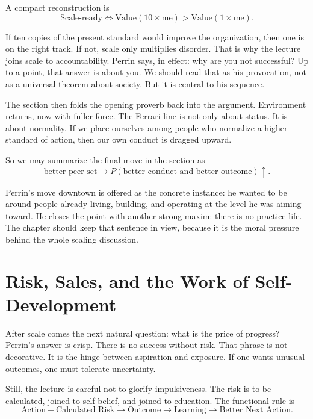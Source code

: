 A compact reconstruction is
\begin{equation}
\text{Scale-ready}
\iff
\text{Value}(10\times \text{me}) > \text{Value}(1\times \text{me}).
\end{equation}

If ten copies of the present standard would improve the organization, then one is on the right track. If not, scale only multiplies disorder. That is why the lecture joins scale to accountability. Perrin says, in effect: why are you not successful? Up to a point, that answer is about you. We should read that as his provocation, not as a universal theorem about society. But it is central to his sequence.

The section then folds the opening proverb back into the argument. Environment returns, now with fuller force. The Ferrari line is not only about status. It is about normality. If we place ourselves among people who normalize a higher standard of action, then our own conduct is dragged upward.

So we may summarize the final move in the section as
\begin{equation}
\text{better peer set} \to P(\text{better conduct and better outcome}) \uparrow .
\end{equation}

Perrin's move downtown is offered as the concrete instance: he wanted to be around people already living, building, and operating at the level he was aiming toward. He closes the point with another strong maxim: there is no practice life. The chapter should keep that sentence in view, because it is the moral pressure behind the whole scaling discussion.

\section{Risk, Sales, and the Work of Self-Development}

After scale comes the next natural question: what is the price of progress? Perrin's answer is crisp. There is no success without risk. That phrase is not decorative. It is the hinge between aspiration and exposure. If one wants unusual outcomes, one must tolerate uncertainty.

Still, the lecture is careful not to glorify impulsiveness. The risk is to be calculated, joined to self-belief, and joined to education. The functional rule is
\begin{equation}
\text{Action} + \text{Calculated Risk}
\to
\text{Outcome}
\to
\text{Learning}
\to
\text{Better Next Action}.
\end{equation}

